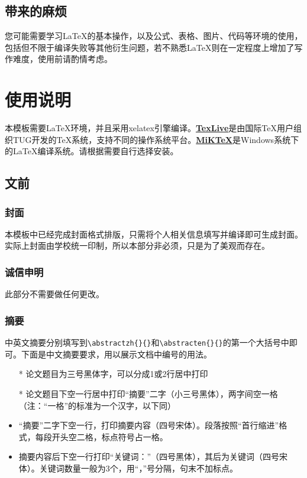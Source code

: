 \documentclass{bucthesis}
\begin{document}
\section{带来的麻烦}{\par
	您可能需要学习\LaTeX{}的基本操作，以及公式、表格、图片、代码等环境的使用，包括但不限于编译失败等其他衍生问题，若不熟悉\LaTeX{}则在一定程度上增加了写作难度，使用前请酌情考虑。\par}

\chapter{使用说明}{\par
	本模板需要\LaTeX{}环境，并且采用xelatex引擎编译。{\textbf{\href{http://tug.org/texlive/}{TexLive}}}是由国际TeX用户组织TUG开发的TeX系统，支持不同的操作系统平台。{\textbf{\href{https://miktex.org/}{MiKTeX}}}是Windows系统下的\LaTeX{}编译系统。请根据需要自行选择安装。}\label{use}

\section{文前}
\subsection{封面}{\par
	本模板中已经完成封面格式排版，只需将个人相关信息填写并编译即可生成封面。实际上封面由学校统一印制，所以本部分非必须，只是为了美观而存在。}
\subsection{诚信申明}{\par
	此部分不需要做任何更改。}
\subsection{摘要}{\par
	中英文摘要分别填写到\verb|\abstractzh{}{}|和\verb|\abstracten{}{}|的第一个大括号中即可。下面是中文摘要要求，用以展示文档中编号的用法。
	\begin{itemize}
		\item[*] 论文题目为三号黑体字，可以分成1或2行居中打印
		\item[*] 论文题目下空一行居中打印“摘要”二字（小三号黑体），两字间空一格（注：“一格”的标准为一个汉字，以下同）
		\item “摘要”二字下空一行，打印摘要内容（四号宋体）。段落按照“首行缩进”格式，每段开头空二格，标点符号占一格。
		\item 摘要内容后下空一行打印“关键词：”（四号黑体），其后为关键词（四号宋体）。关键词数量一般为3个，用“，”号分隔，句末不加标点。
	\end{itemize}
}
\end{document}
